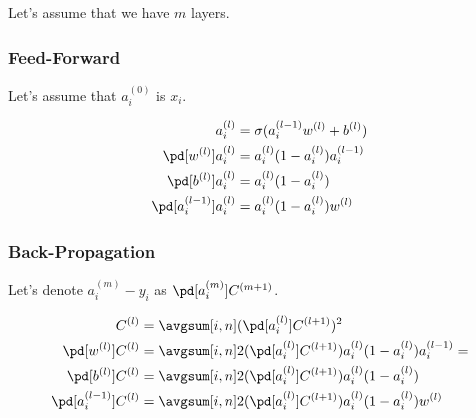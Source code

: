 \documentclass{article}
\begin{document}
Let's assume that we have $m$ layers.

\subsubsection{Feed-Forward}

Let's assume that $a_i^{(0)}$ is $x_i$.

\begin{align}
  a_i^{(l)} &= \sigma(a_i^{(l-1)}w^{(l)} + b^{(l)}) \\
  \pd[w^{(l)}]a_i^{(l)} &= a_i^{(l)}(1 - a_i^{(l)})a_i^{(l-1)} \\
  \pd[b^{(l)}]a_i^{(l)} &= a_i^{(l)}(1 - a_i^{(l)}) \\
  \pd[a_i^{(l-1)}]a_i^{(l)} &= a_i^{(l)}(1 - a_i^{(l)})w^{(l)} \\
\end{align}

\subsubsection{Back-Propagation}

Let's denote $a_i^{(m)} - y_i$ as $\pd[a_i^{(m)}]C^{(m+1)}$.

\begin{align}
  C^{(l)} &= \avgsum[i, n] (\pd[a_i^{(l)}]C^{(l+1)})^2 \\
  \pd[w^{(l)}]C^{(l)} &= \avgsum[i, n] 2(\pd[a_i^{(l)}]C^{(l+1)})a_i^{(l)}(1 - a_i^{(l)})a_i^{(l-1)} =\\
  \pd[b^{(l)}]C^{(l)} &= \avgsum[i, n] 2(\pd[a_i^{(l)}]C^{(l+1)})a_i^{(l)}(1 - a_i^{(l)}) \\
  \pd[a_i^{(l-1)}]C^{(l)} &= \avgsum[i, n] 2(\pd[a_i^{(l)}]C^{(l+1)})a_i^{(l)}(1 - a_i^{(l)})w^{(l)} \\
\end{align}
\end{document}
